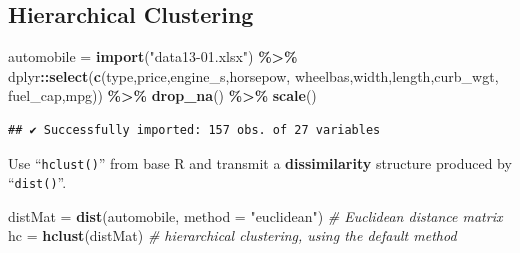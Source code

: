 \documentclass[
]{ctexart}
\newenvironment{Shaded}{\begin{snugshade}}{\end{snugshade}}
\newcommand{\AttributeTok}[1]{\textcolor[rgb]{0.13,0.29,0.53}{#1}}
\newcommand{\CommentTok}[1]{\textcolor[rgb]{0.56,0.35,0.01}{\textit{#1}}}
\newcommand{\FunctionTok}[1]{\textcolor[rgb]{0.13,0.29,0.53}{\textbf{#1}}}
\newcommand{\NormalTok}[1]{#1}
\newcommand{\OtherTok}[1]{\textcolor[rgb]{0.56,0.35,0.01}{#1}}
\newcommand{\SpecialCharTok}[1]{\textcolor[rgb]{0.81,0.36,0.00}{\textbf{#1}}}
\newcommand{\StringTok}[1]{\textcolor[rgb]{0.31,0.60,0.02}{#1}}
\begin{document}
\hypertarget{hierarchical-clustering}{%
\subsection{Hierarchical Clustering}\label{hierarchical-clustering}}

\begin{Shaded}
\begin{Highlighting}[]
\NormalTok{automobile }\OtherTok{=} \FunctionTok{import}\NormalTok{(}\StringTok{"data13{-}01.xlsx"}\NormalTok{) }\SpecialCharTok{\%\textgreater{}\%} 
\NormalTok{  dplyr}\SpecialCharTok{::}\FunctionTok{select}\NormalTok{(}\FunctionTok{c}\NormalTok{(}\StringTok{\textquotesingle{}type\textquotesingle{}}\NormalTok{,}\StringTok{\textquotesingle{}price\textquotesingle{}}\NormalTok{,}\StringTok{\textquotesingle{}engine\_s\textquotesingle{}}\NormalTok{,}\StringTok{\textquotesingle{}horsepow\textquotesingle{}}\NormalTok{,}
           \StringTok{\textquotesingle{}wheelbas\textquotesingle{}}\NormalTok{,}\StringTok{\textquotesingle{}width\textquotesingle{}}\NormalTok{,}\StringTok{\textquotesingle{}length\textquotesingle{}}\NormalTok{,}\StringTok{\textquotesingle{}curb\_wgt\textquotesingle{}}\NormalTok{,}
           \StringTok{\textquotesingle{}fuel\_cap\textquotesingle{}}\NormalTok{,}\StringTok{\textquotesingle{}mpg\textquotesingle{}}\NormalTok{)) }\SpecialCharTok{\%\textgreater{}\%} \FunctionTok{drop\_na}\NormalTok{() }\SpecialCharTok{\%\textgreater{}\%} \FunctionTok{scale}\NormalTok{()}
\end{Highlighting}
\end{Shaded}

\begin{verbatim}
## ✔ Successfully imported: 157 obs. of 27 variables
\end{verbatim}

Use ``\texttt{hclust()}'' from base R and transmit a
\textbf{dissimilarity} structure produced by ``\texttt{dist()}''.

\begin{Shaded}
\begin{Highlighting}[]
\NormalTok{distMat }\OtherTok{=} \FunctionTok{dist}\NormalTok{(automobile, }\AttributeTok{method =} \StringTok{"euclidean"}\NormalTok{) }\CommentTok{\# Euclidean distance matrix}
\NormalTok{hc }\OtherTok{=} \FunctionTok{hclust}\NormalTok{(distMat)  }\CommentTok{\# hierarchical clustering, using the default method}
\end{Highlighting}
\end{Shaded}
\end{document}
